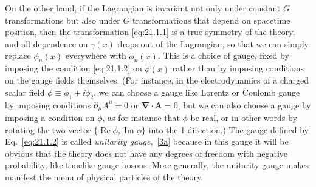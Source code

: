 On the other hand, if the Lagrangian is invariant not only under constant
$G$ transformations but also under $G$ transformations that depend on
spacetime position, then the transformation \eqref{eq:21.1.1} is a true
symmetry of the theory, and all dependence on $\gamma(x)$ drops out of the
Lagrangian, so that we can simply replace $\phi_n(x)$ everywhere with
$\widetilde{\phi}_n(x)$. This is a choice of gauge, fixed by imposing the
condition \eqref{eq:21.1.2} on $\widetilde{\phi}(x)$ rather than by imposing
conditions on the gauge fields themselves. (For instance, in the
electrodynamics of a charged scalar field $\phi\equiv\phi_1+\ii\phi_2$, we
can choose a gauge like Lorentz or Coulomb gauge by imposing conditions
$\partial_\mu A^\mu=0$ or $\boldsymbol{\nabla}\cdot\mathbf A=0$, but we can
also choose a gauge by imposing a condition on $\phi$, as for instance that
$\phi$ be real, or in other words by rotating the two-vector
$\{\operatorname{Re}\phi,\operatorname{Im}\phi\}$ into the 1-direction.)
The gauge defined by Eq.~\eqref{eq:21.1.2} is called \emph{unitarity
gauge},~\hyperref[ch21-ref-3a]{[3a]} because in this gauge it will be
obvious that the theory does not have any degrees of freedom with negative
probability, like timelike gauge bosons. More generally, the unitarity gauge
makes manifest the menu of physical particles of the theory.

